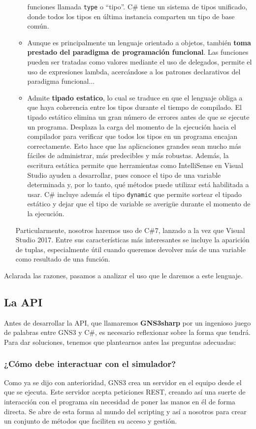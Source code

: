 \begin{itemize}
\begin{itemize}
funciones llamada \texttt{type} o ``tipo''. C\# tiene un sistema de tipos unificado, donde todos los tipos en última instancia comparten un tipo de base común.
\item Aunque es principalmente un lenguaje orientado a objetos, también \textbf{toma prestado del paradigma de programación funcional}. Las funciones pueden ser tratadas como valores mediante el uso de delegados, permite el uso de expresiones lambda, acercándose a los patrones declarativos del paradigma funcional...
\item Admite \textbf{tipado estatico}, lo cual se traduce en que el lenguaje obliga a que haya coherencia entre los tipos durante el tiempo de compilado. El tipado estático elimina un gran número de errores antes de que se ejecute un programa. Desplaza la carga del momento de la ejecución hacia el compilador para verificar que todos los tipos en un programa encajan correctamente. Esto hace que las aplicaciones grandes sean mucho más fáciles de administrar, más predecibles y más robustas. Además, la escritura estática permite que herramientas como IntelliSense en Visual Studio ayuden a desarrollar, pues conoce el tipo de una variable determinada y, por lo tanto, qué métodos puede utilizar está habilitada a usar. C\# incluye además el tipo \texttt{dynamic} que permite sortear el tipado estático y dejar que el tipo de variable se averigüe durante el momento de la ejecución\cite{csnutshell}.
\end{itemize}
Particularmente, nosotros haremos uso de C\#7, lanzado a la vez que Visual Studio 2017. Entre sus características más interesantes se incluye la aparición de tuplas, especialmente útil cuando queremos devolver más de una variable como resultado de una función.
\end{itemize}
Aclarada las razones, pasamos a analizar el uso que le daremos a este lenguaje.

\subsection{La API}
Antes de desarrollar la API, que llamaremos \textbf{GNS3sharp} por un ingenioso juego de palabras entre GNS3 y C\#, es necesario reflexionar sobre la forma que tendrá. Para dar soluciones, tenemos que plantearnos antes las preguntas adecuadas:
\subsubsection[Interacción con GNS3]{¿Cómo debe interactuar con el simulador?}
Como ya se dijo con anterioridad, GNS3 crea un servidor en el equipo desde el que se ejecuta. Este servidor acepta peticiones REST, creando así una suerte de interacción con el programa sin necesidad de poner las manos en él de forma directa. Se abre de esta forma al mundo del scripting y así a nosotros para crear un conjunto de métodos que faciliten su acceso y gestión.

